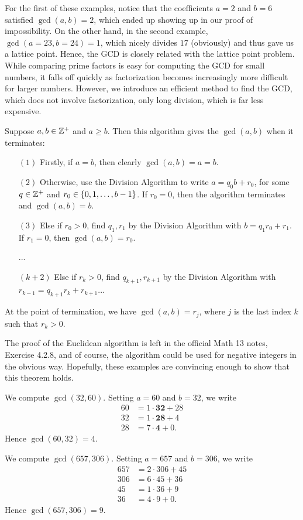 \documentclass{article}
\begin{document}
For the first of these examples, notice that the coefficients $a=2$ and $b=6$ satisfied $\gcd(a,b) = 2$, which ended up showing up in our proof of impossibility. On the other hand, in the second example, $\gcd(a = 23, b=24) = 1$, which nicely divides $17$ (obviously) and thus gave us a lattice point. Hence, the GCD is closely related with the lattice point problem. While comparing prime factors is easy for computing the GCD for small numbers, it falls off quickly as factorization becomes increasingly more difficult for larger numbers. However, we introduce an efficient method to find the GCD, which does not involve factorization, only long division, which is far less expensive.
\begin{theorem}\label{euclidean algorithm}
Suppose $a,b\in\mathbb Z^+$ and $a\geq b$. Then this algorithm gives the $\gcd(a, b)$ when it terminates:
\begin{enumerate}
    \item[$(1)$] Firstly, if $a=b$, then clearly $\gcd(a, b) = a=b$.
    \item[$(2)$] Otherwise, use the Division Algorithm to write $a = q_0b + r_0$, for some $q\in\mathbb Z^+$ and $r_0 \in \left\{0, 1, \ldots, b-1\right\}$. If $r_0 = 0$, then the algorithm terminates and $\gcd(a,b) = b$.
    \item[$(3)$] Else if $r_0 > 0$, find $q_1, r_1$ by the Division Algorithm with $b = q_1r_0 + r_1$. If $r_1 = 0$, then $\gcd(a, b) = r_0$.
    \item[] ...
    \item[$(k+2)$] Else if $r_k > 0$, find $q_{k+1}, r_{k+1}$ by the Division Algorithm with $r_{k-1} = q_{k+1}r_k + r_{k+1}$...
\end{enumerate}
At the point of termination, we have $\gcd(a, b) = r_j$, where $j$ is the last index $k$ such that $r_k > 0$.
\end{theorem}
The proof of the Euclidean algorithm is left in the official Math 13 notes, Exercise 4.2.8, and of course, the algorithm could be used for negative integers in the obvious way. Hopefully, these examples are convincing enough to show that this theorem holds.
\begin{example}
We compute $\gcd(32, 60)$. Setting $a = 60$ and $b = 32$, we write
\begin{align*}
    60 &= 1\cdot \textbf{32} + 28 \\
    32 &= 1\cdot \textbf{28} + 4 \\
    28 &= 7\cdot \textbf{4} + 0.
\end{align*}
Hence $\gcd(60, 32) = 4$.
\end{example}
\newpage
\begin{example}
We compute $\gcd(657, 306)$. Setting $a=657$ and $b = 306$, we write
\begin{align*}
657 &= 2\cdot 306 + 45\\
306 &= 6\cdot 45 + 36 \\
45 &= 1\cdot 36 + 9 \\
36 &= 4\cdot 9 + 0.
\end{align*}
Hence $\gcd(657, 306) = 9$.
\end{example}
\end{document}
